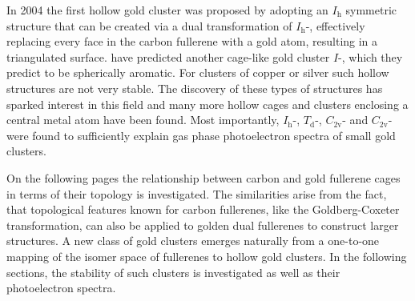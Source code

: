 In 2004 the first hollow gold cluster  was proposed by
\citeauthor{Johansson_Au3224CaratGolden_2004}\autocite{Johansson_Au3224CaratGolden_2004}
adopting an $I_\text{h}$ symmetric structure that can be created via a dual
transformation of $I_\text{h}$-, effectively replacing every face in the
carbon fullerene with a gold atom, resulting in a triangulated surface.
\citeauthor{Karttunen_IcosahedralAu72_2008}\autocite{Karttunen_IcosahedralAu72_2008}
have predicted another cage-like gold cluster $I$-, which they predict
to be spherically aromatic. For clusters of copper or silver such hollow
structures are not very
stable.\autocite{Johansson_Au3224CaratGolden_2004,FERNANDEZ_DENSITYFUNCTIONALSTUDIES_2006}
The discovery of these types of structures has sparked interest in this field
and many more hollow
cages\autocite{Gu-2004,Fernandez-2006,Fa-Dong-2006,Fa-Zhou-2006,Karttunen_IcosahedralAu72_2008,Fa-Luong-2008,Chen_Structuresneutralanionic_2010,Tian-2011,De-2012,Ning-2014,Joshi-2015}
and clusters enclosing a central metal
atom\autocite{Autschbach_PropertiesWAu12_2004,Zhai-2004,Gao-Bulusu-2005,Wang_Dopinggoldencage_2007,Wang_DopingGoldenBuckyballs_2007,Fa_StructuresMAu16Ag_2008,Munoz-2013,Manna-2013,Tang-2013}
have been found. Most importantly, $I_\text{h}$-,
$T_\text{d}$-, $C_\text{2v}$- and
$C_\text{2v}$- were found to sufficiently explain gas phase
photoelectron spectra of small gold clusters.\autocite{Ji-2005,Bulusu_Evidencehollowgolden_2006}

On the following pages the relationship between carbon and gold fullerene cages
in terms of their topology is investigated. The similarities arise from the
fact, that topological features known for carbon
fullerenes\autocite{Cataldo-Ori-2011,Schwerdtfeger_topologyfullerenes_2015,Fowler-atlas-2006},
like the Goldberg-Coxeter
transformation,\autocite{Goldberg_ClassMultiSymmetricPolyhedra_1937,Coxeter-1971}
can also be applied to golden dual fullerenes to construct larger structures. A
new class of gold clusters emerges naturally from a one-to-one mapping of the
isomer space of fullerenes to hollow gold clusters. In the following sections,
the stability of such clusters is investigated as well as their photoelectron
spectra. 


